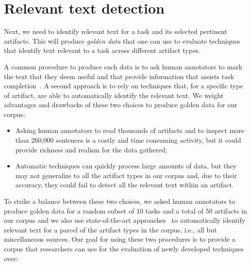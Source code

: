 


\section{Relevant text detection}
\label{cp4:corpus-relevant-text}





Next, we need to identify relevant text for a task and its selected pertinent artifacts.
This will produce \textit{golden data} that one can use to evaluate  
techniques that identify text relevant to a task across different artifact types. 



A common procedure to produce such data is to ask human annotators to
mark the text that they deem useful and that provide information that assists task completion~\cite{nadi2020, Robillard2015, marques2020}.
A second approach is to rely on techniques that, for a specific type of artifact, are able to automatically 
identify the relevant text.
We weight advantages and drawbacks of these two choices to produce golden data for our corpus:


\begin{itemize}
    \item Asking human annotators to read thousands of artifacts and to inspect more than 260,000 sentences
    is a costly and time consuming activity, but it could provide richness and realism for the data gathered; 
    \item Automatic techniques can quickly process large amounts of data, but they may not generalize to all the artifact types in our corpus and, due to their accuracy, they could fail to detect all the relevant text within an artifact.
\end{itemize}



To strike a balance between these two choices, we asked human annotators to produce golden data for a random subset of 10 tasks and a total of 50 artifacts in our corpus and we also use state-of-the-art approaches~\cite{nadi2020, Robillard2015, Lotufo2012, Xu2017} to automatically identify relevant text for a parcel of the artifact types in the corpus, i.e., all but miscellaneous sources. 
Our goal for using these two procedures is to provide a corpus that researchers can use for the evaluation of newly developed techniques over:


